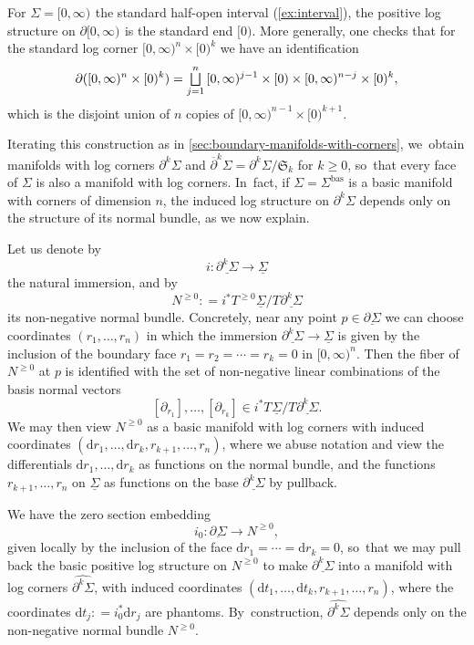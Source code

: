 \documentclass[10pt]{amsart}
\let\oldbigsqcup\bigsqcup
\renewcommand{\bigsqcup}{\mathop{\textstyle\oldbigsqcup}\displaylimits}
\theoremstyle{definition}
\theoremstyle{remark}
\newenvironment{example}
  {\pushQED{\qed}\renewcommand{\qedsymbol}{$\lozenge$}\examplex}
  {\popQED\endexamplex}
\newcommand{\model}[2]{\halfspc{#1}\times[0)^{#2}}
\newcommand{\halfspc}[1]{[0,\infty)^{#1}}
\renewcommand{\ge}{\geqslant}
\newcommand{\defas}{\mathrel{\mathop:}=}
\newcommand{\dd}{\mathrm{d}}
\newcommand{\cvf}[1]{\partial_{#1}}
\newcommand{\Sig}{\Sigma}
\newcommand{\uSig}{\underline{\Sigma}}
\newcommand{\bas}[1]{{#1}^{\mathrm{bas}}}
\newcommand{\Sigbas}{\bas{\Sig}}
\newcommand{\ubdSig}[1][]{\underline{\partial^{#1}\Sigma}}
\newcommand{\bdSig}[1][]{\partial^{#1}\Sigma}
\newcommand{\tb}[2][]{T_{#1}#2}
\newcommand{\tbge}[2][]{T^{\ge0}_{#1}#2}
\newcommand{\symgp}[1]{\mathfrak{S}_{#1}}
\begin{document}
\begin{example}
For $\Sig=\halfspc{}$ the standard half-open interval (\autoref{ex:interval}), the positive log structure on $\partial\halfspc{}$ is the standard end $[0)$. More generally, one checks that for the standard log corner $\model{n}{k}$ we have an identification
\[
\partial(\model{n}{k}) = \bigsqcup_{j=1}^n \, \halfspc{j-1}\times [0) \times \halfspc{n-j}\times [0)^k,
\]
which is the disjoint union of $n$ copies of $\model{n-1}{k+1}$.
\end{example}

Iterating this construction as in \autoref{sec:boundary-manifolds-with-corners}, we~obtain manifolds with log corners $\bdSig[k]$ and $\overline{\partial}^k\Sig = \bdSig[k]/\symgp{k}$ for $k \ge 0$, so~that every face of $\Sig$ is also a manifold with log corners. In~fact, if $\Sig=\Sigbas$ is a basic manifold with corners of dimension $n$, the induced log structure on $\bdSig[k]$ depends only on the structure of its normal bundle, as we now explain.

Let us denote by
\[
i \colon \ubdSig[k] \to \uSig
\]
the natural immersion, and by
\[
N^{\ge0} \defas i^*\tbge{\uSig}/\tb{\ubdSig[k]}
\]
its non-negative normal bundle. Concretely, near any point $p \in \ubdSig$ we can choose coordinates $(r_1,\ldots,r_n)$ in which the immersion $\ubdSig[k] \to \uSig$ is given by the inclusion of the boundary face $r_1=r_2=\cdots=r_k=0$ in $[0,\infty)^n$. Then the fiber of $N^{\ge0}$ at $p$ is identified with the set of non-negative linear combinations of the basis normal vectors
\[
[\cvf{r_1}],\ldots,[\cvf{r_k}] \in i^*\tb{\uSig}/\tb{\ubdSig[k]}.
\]
We may then view $N^{\ge 0}$ as a basic manifold with log corners with induced coordinates $(\dd r_1,\ldots, \dd r_k, r_{k+1},\ldots,r_{n})$,
where we abuse notation and view the differentials $\dd r_1,\ldots,\dd r_k$ as functions on the normal bundle, and the functions $r_{k+1},\ldots, r_n$ on $\uSig$ as functions on the base $\ubdSig[k]$ by pullback.

We have the zero section embedding
\[
i_0 : \ubdSig \to N^{\ge 0},
\]
given locally by the inclusion of the face $\dd r_1=\cdots = \dd r_k = 0$, so~that we may pull back the basic positive log structure on $N^{\ge 0}$ to make $\ubdSig[k]$ into a manifold with log corners $\widehat{\bdSig[k]}$, with induced coordinates $(\dd t_1,\ldots, \dd t_k,r_{k+1},\ldots, r_n)$, where the coordinates $\dd t_j \defas i_0^* \dd r_j$ are phantoms. By~construction, $\widehat{\bdSig[k]}$ depends only on the non-negative normal bundle $N^{\ge0}$.
\end{document}
